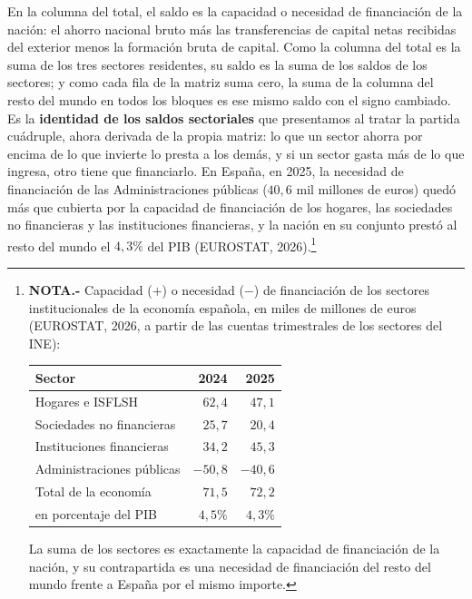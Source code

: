 \documentclass[10pt,a4paper]{article}
\begin{document}
En la columna del total, el saldo es la capacidad o necesidad de financiación de la nación: el ahorro nacional bruto más las transferencias de capital netas recibidas del exterior menos la formación bruta de capital. Como la columna del total es la suma de los tres sectores residentes, su saldo es la suma de los saldos de los sectores; y como cada fila de la matriz suma cero, la suma de la columna del resto del mundo en todos los bloques es ese mismo saldo con el signo cambiado. Es la \textbf{identidad de los saldos sectoriales} que presentamos al tratar la partida cuádruple, ahora derivada de la propia matriz: lo que un sector ahorra por encima de lo que invierte lo presta a los demás, y si un sector gasta más de lo que ingresa, otro tiene que financiarlo. En España, en 2025, la necesidad de financiación de las Administraciones públicas ($40{,}6$ mil millones de euros) quedó más que cubierta por la capacidad de financiación de los hogares, las sociedades no financieras y las instituciones financieras, y la nación en su conjunto prestó al resto del mundo el $4{,}3\%$ del PIB (EUROSTAT, 2026).\footnote{%
    \textbf{NOTA.-} Capacidad ($+$) o necesidad ($-$) de financiación de los sectores institucionales de la economía española, en miles de millones de euros (EUROSTAT, 2026, a partir de las cuentas trimestrales de los sectores del INE):
    \begin{center}
    \footnotesize
    \begin{tabular}{lrr}
        \hline
        Sector & 2024 & 2025 \\
        \hline
        Hogares e ISFLSH & $62{,}4$ & $47{,}1$ \\
        Sociedades no financieras & $25{,}7$ & $20{,}4$ \\
        Instituciones financieras & $34{,}2$ & $45{,}3$ \\
        Administraciones públicas & $-50{,}8$ & $-40{,}6$ \\
        \hline
        Total de la economía & $71{,}5$ & $72{,}2$ \\
        \quad en porcentaje del PIB & $4{,}5\%$ & $4{,}3\%$ \\
        \hline
    \end{tabular}
    \end{center}
    La suma de los sectores es exactamente la capacidad de financiación de la nación, y su contrapartida es una necesidad de financiación del resto del mundo frente a España por el mismo importe.
}
\end{document}
